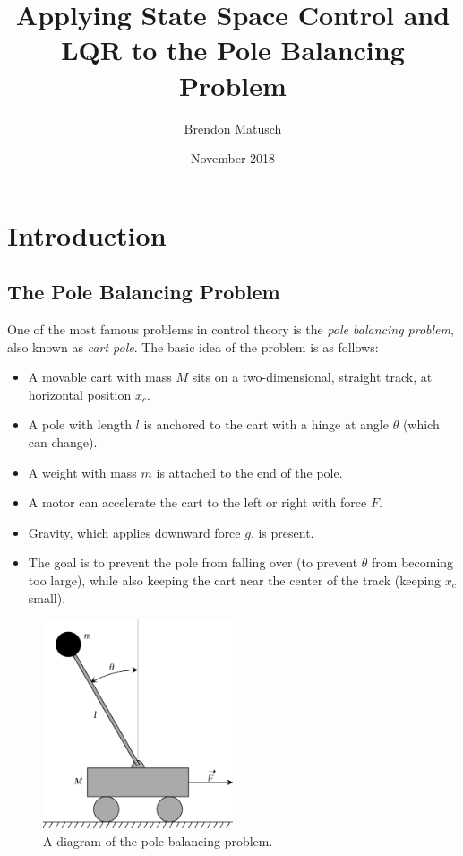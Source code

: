 \documentclass[11pt]{article}
\begin{document}
\title{Applying State Space Control and LQR to the Pole Balancing Problem}
\author{Brendon Matusch}
\date{November 2018}
\maketitle

\section{Introduction}

\subsection{The Pole Balancing Problem} \label{problem}

One of the most famous problems in control theory is the \textit{pole balancing problem}, also known as \textit{cart pole}. The basic idea of the problem is as follows:

\begin{itemize}
    \item A movable cart with mass $M$ sits on a two-dimensional, straight track, at horizontal position $x _c$.
    \item A pole with length $l$ is anchored to the cart with a hinge at angle $\theta$ (which can change).
    \item A weight with mass $m$ is attached to the end of the pole.
    \item A motor can accelerate the cart to the left or right with force $F$.
    \item Gravity, which applies downward force $g$, is present.
    \item The goal is to prevent the pole from falling over (to prevent $\theta$ from becoming too large), while also keeping the cart near the center of the track (keeping $x _c$ small).
\end{itemize}

\begin{figure}[ht]
    \centering
    \includegraphics[width=0.5\textwidth]{cartpole}
    \caption{\label{cartpole} A diagram of the pole balancing problem.}
\end{figure}
\end{document}
